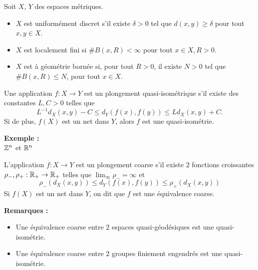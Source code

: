 \documentclass{beamer}
\begin{document}
\begin{frame}
Soit $X$, $Y$ des espaces métriques.\\
\begin{definition}
\begin{itemize}
\item $X$ est uniformément discret s'il existe $\delta>0$ tel que $d(x,y)\geq\delta$ pour tout $x,y\in X$. 
\item $X$ est localement fini si $\# B(x,R)<\infty$ pour tout $x\in X,R>0$.
\item $X$ est à géométrie bornée si, pour tout $R>0$, il existe $N>0$ tel que $\# B(x,R)\leq N$, pour tout $x\in X$.
\end{itemize}
\end{definition}
\end{frame}
 
\begin{frame}
\begin{definition}

Une application $f : X\rightarrow Y$ est un plongement quasi-isométrique s'il existe des constantes $L,C>0$ telles que 
\[L^{-1} d_X(x,y)-C\leq d_Y(f(x),f(y))\leq L d_X(x,y)+C .\]
Si de plus, $f(X)$ est un net dans $Y$, alors $f$ est une quasi-isométrie.
\end{definition}
\textbf{Exemple :}\\
$\mathbb Z^n$ et $\mathbb R^n$

\end{frame}

\begin{frame}
\begin{definition}
L'application $f : X\rightarrow Y$ est un plongement coarse s'il existe $2$ fonctions croissantes $\rho_-,\rho_+ : \mathbb R_+\rightarrow \mathbb R_+$ telles que $\lim_{\infty} \rho_-=\infty$ et 
\[\rho_-(d_X(x,y))\leq d_Y(f(x),f(y))\leq \rho_+(d_X(x,y))\]
Si $f(X)$ est un net dans $Y$, on dit que $f$ est une équivalence coarse.
\end{definition}
\textbf{Remarques :}
\begin{itemize}
\item Une équivalence coarse entre $2$ espaces quasi-géodésiques est une quasi-isométrie.
\item Une équivalence coarse entre $2$ groupes finiement engendrés est une quasi-isométrie.
\end{itemize}
\end{frame}
\end{document}
